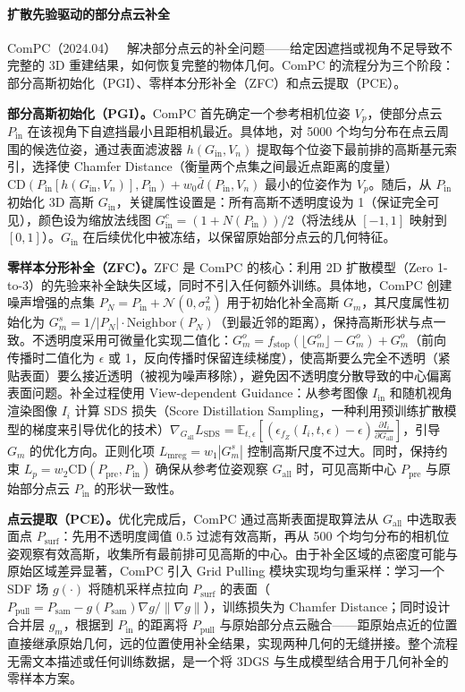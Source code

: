 \paragraph{扩散先验驱动的部分点云补全}

ComPC（2024.04）~\cite{2404_06814} 解决部分点云的补全问题——给定因遮挡或视角不足导致不完整的 3D 重建结果，如何恢复完整的物体几何。ComPC 的流程分为三个阶段：部分高斯初始化（PGI）、零样本分形补全（ZFC）和点云提取（PCE）。

\textbf{部分高斯初始化（PGI）。}ComPC 首先确定一个参考相机位姿 $V_p$，使部分点云 $P_{\text{in}}$ 在该视角下自遮挡最小且距相机最近。具体地，对 5000 个均匀分布在点云周围的候选位姿，通过表面滤波器 $h(G_{\text{in}}, V_n)$ 提取每个位姿下最前排的高斯基元索引，选择使 Chamfer Distance（衡量两个点集之间最近点距离的度量）$\text{CD}(P_{\text{in}}[h(G_{\text{in}}, V_n)], P_{\text{in}}) + w_0 \bar{d}(P_{\text{in}}, V_n)$ 最小的位姿作为 $V_p$。随后，从 $P_{\text{in}}$ 初始化 3D 高斯 $G_{\text{in}}$，关键属性设置是：所有高斯不透明度设为 1（保证完全可见），颜色设为缩放法线图 $G_{\text{in}}^c = (1 + N(P_{\text{in}}))/2$（将法线从 $[-1,1]$ 映射到 $[0,1]$）。$G_{\text{in}}$ 在后续优化中被冻结，以保留原始部分点云的几何特征。

\textbf{零样本分形补全（ZFC）。}ZFC 是 ComPC 的核心：利用 2D 扩散模型（Zero 1-to-3）的先验来补全缺失区域，同时不引入任何额外训练。具体地，ComPC 创建噪声增强的点集 $P_N = P_{\text{in}} + \mathcal{N}(0, \sigma_n^2)$ 用于初始化补全高斯 $G_m$，其尺度属性初始化为 $G_m^s = 1/|P_N| \cdot \text{Neighbor}(P_N)$（到最近邻的距离），保持高斯形状与点一致。不透明度采用可微量化实现二值化：$G_m^o = f_{\text{stop}}(\lfloor G_m^o \rfloor - G_m^o) + G_m^o$（前向传播时二值化为 $\epsilon$ 或 1，反向传播时保留连续梯度），使高斯要么完全不透明（紧贴表面）要么接近透明（被视为噪声移除），避免因不透明度分散导致的中心偏离表面问题。补全过程使用 View-dependent Guidance：从参考图像 $I_{\text{in}}$ 和随机视角渲染图像 $I_i$ 计算 SDS 损失（Score Distillation Sampling，一种利用预训练扩散模型的梯度来引导优化的技术）$\nabla_{G_{\text{all}}} L_{\text{SDS}} = \mathbb{E}_{t,\epsilon}[(\epsilon_{f_Z}(I_i, t, \epsilon) - \epsilon) \frac{\partial I_i}{\partial G_{\text{all}}}]$，引导 $G_m$ 的优化方向。正则化项 $L_{\text{mreg}} = w_1 |G_m^s|$ 控制高斯尺度不过大。同时，保持约束 $L_p = w_2 \text{CD}(P_{\text{pre}}, P_{\text{in}})$ 确保从参考位姿观察 $G_{\text{all}}$ 时，可见高斯中心 $P_{\text{pre}}$ 与原始部分点云 $P_{\text{in}}$ 的形状一致性。

\textbf{点云提取（PCE）。}优化完成后，ComPC 通过高斯表面提取算法从 $G_{\text{all}}$ 中选取表面点 $P_{\text{surf}}$：先用不透明度阈值 0.5 过滤有效高斯，再从 500 个均匀分布的相机位姿观察有效高斯，收集所有最前排可见高斯的中心。由于补全区域的点密度可能与原始区域差异显著，ComPC 引入 Grid Pulling 模块实现均匀重采样：学习一个 SDF 场 $g(\cdot)$ 将随机采样点拉向 $P_{\text{surf}}$ 的表面（$P_{\text{pull}} = P_{\text{sam}} - g(P_{\text{sam}})\nabla g / \|\nabla g\|$），训练损失为 Chamfer Distance；同时设计合并层 $g_m$，根据到 $P_{\text{in}}$ 的距离将 $P_{\text{pull}}$ 与原始部分点云融合——距原始点近的位置直接继承原始几何，远的位置使用补全结果，实现两种几何的无缝拼接。整个流程无需文本描述或任何训练数据，是一个将 3DGS 与生成模型结合用于几何补全的零样本方案。

